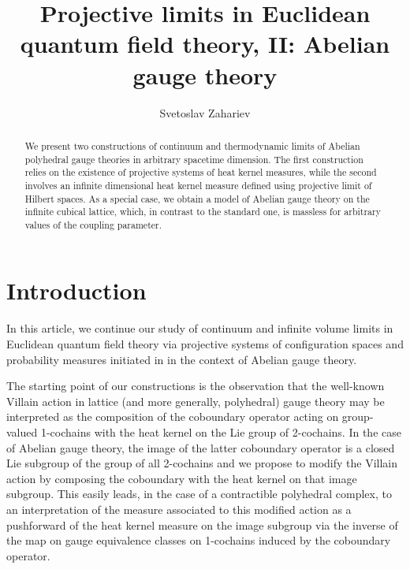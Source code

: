 \documentclass[11pt,reqno]{amsart}
\numberwithin{equation}{section}
\theoremstyle{remark}
\theoremstyle{rmdefinition}
\begin{document}
\title[Projective limits]{Projective limits in Euclidean quantum field theory, II: Abelian gauge theory}

\author{Svetoslav Zahariev}
\address{MEC Department, LaGuardia Community College of The City University of New York, 31-10 Thomson Ave., Long Island City, NY 11101, U.S.A.}

\maketitle
\begin{abstract}
We present two constructions of continuum and thermodynamic limits of Abelian polyhedral gauge theories in arbitrary spacetime dimension. The first construction relies on the existence of projective systems of heat kernel measures, while the second involves an infinite dimensional heat kernel measure defined using projective limit of Hilbert spaces. As a special case, we obtain a model of Abelian gauge theory on the infinite cubical lattice, which, in contrast to the standard one, is massless for arbitrary values of the coupling parameter.
\end{abstract}
\section{Introduction}

In this article, we continue our study of continuum and infinite volume limits in Euclidean quantum field theory via projective systems of configuration spaces and probability measures initiated in \cite{Z1} in the context of Abelian gauge theory. 

The starting point of our constructions is the observation that the well-known Villain action in lattice (and more generally, polyhedral) gauge theory may be interpreted as the composition of the coboundary operator acting on group-valued 1-cochains with the heat kernel on the Lie group of 2-cochains. In the case of Abelian gauge theory, the image of the latter coboundary operator is a closed Lie subgroup of the group of all 2-cochains and we propose to modify the Villain action by composing the coboundary with the heat kernel on that image subgroup. This easily leads, in the case of a contractible polyhedral complex, to an interpretation of the measure associated to this modified action as a pushforward of the heat kernel measure on the image subgroup via the inverse of the map on gauge equivalence classes on 1-cochains induced by the coboundary operator.
\end{document}
